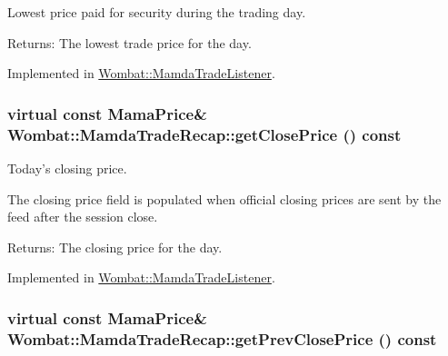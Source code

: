 Lowest price paid for security during the trading day. 

\begin{Desc}
\item[Returns:]The lowest trade price for the day. \end{Desc}


Implemented in \hyperlink{classWombat_1_1MamdaTradeListener_3358318d745bd8ae681eceba0c7df077}{Wombat::Mamda\-Trade\-Listener}.\hypertarget{classWombat_1_1MamdaTradeRecap_3a566a9b8bc9a4d2ac34eec055b91a92}{
\subsubsection[getClosePrice]{\setlength{\rightskip}{0pt plus 5cm}virtual const Mama\-Price\& Wombat::Mamda\-Trade\-Recap::get\-Close\-Price () const}}
\label{classWombat_1_1MamdaTradeRecap_3a566a9b8bc9a4d2ac34eec055b91a92}


Today's closing price. 

The closing price field is populated when official closing prices are sent by the feed after the session close.

\begin{Desc}
\item[Returns:]The closing price for the day. \end{Desc}


Implemented in \hyperlink{classWombat_1_1MamdaTradeListener_cdd9837ec44cbdfb5bd15b563d99ba7b}{Wombat::Mamda\-Trade\-Listener}.\hypertarget{classWombat_1_1MamdaTradeRecap_a612fcb5d25ec608317992115fd05349}{
\subsubsection[getPrevClosePrice]{\setlength{\rightskip}{0pt plus 5cm}virtual const Mama\-Price\& Wombat::Mamda\-Trade\-Recap::get\-Prev\-Close\-Price () const}}
\label{classWombat_1_1MamdaTradeRecap_a612fcb5d25ec608317992115fd05349}


